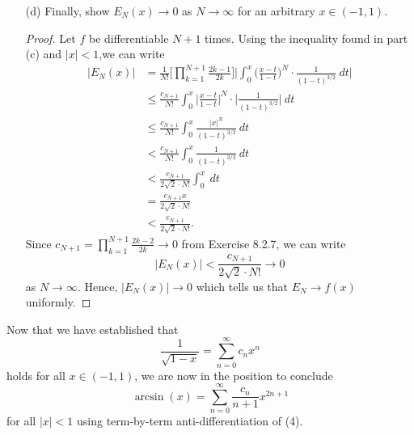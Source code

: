 \begin{enumerate}
\begin{proof}[Solution]
\begin{align*}
                                                     &\leq \sqrt{ (x - t )^{2} }  \\
                                                     &= |  x -t  | \\
                                                     &\leq |  x  |
        \end{align*}
        which holds for \(  t   \).
        \end{proof}
    \item[(d)] Finally, show \( E_{N}(x) \to 0  \) as \( N \to \infty  \) for an arbitrary \( x \in (-1 , 1) \).
        \begin{proof}
        Let \( f  \) be differentiable \( N + 1  \) times. Using the inequality found in part (c) and \( |  x  |  < 1  \),we can write 
        \begin{align*}
            |E_{N}(x)| &= \frac{ 1 }{ N! } \Big[ \prod_{k=1}^{N+1}   \frac{ 2k-1 }{ 2k }  \Big] \Big| \int_{ 0 }^{ x }  \Big( \frac{ x- t  }{ 1 -t  }  \Big)^{N} \cdot \frac{ 1  }{ (1 -t)^{3/2} }  \ dt \Big|  \\
            &\leq \frac{ c_{N+1} }{ N! }  \int_{ 0 }^{ x  } \Big|  \frac{ x -t  }{ 1 - t  } \Big|^{N}      \cdot \Big|  \frac{ 1 }{ (1-t)^{3/2} } \Big| \  dt   \\
            &\leq \frac{ c_{N+1} }{ N! }  \int_{ 0 }^{ x }  \frac{ |x|^{N} }{  (1-t)^{3/2} } \  dt \\
                     &< \frac{ c_{N+1} }{ N! }   \int_{ 0 }^{ x }  \frac{ 1 }{ (1-t)^{3/2} } \  dt \\
                     &< \frac{ c_{N+1} }{ 2\sqrt{ 2 } \cdot N!  }  \int_{ 0 }^{ x }  \ dt  \\
                     &= \frac{ c_{N+1} x  }{ 2 \sqrt{ 2 }  \cdot N!  }   \\
                     &< \frac{ c_{N+1} }{ 2 \sqrt{ 2 }  \cdot N!  }.
        \end{align*}
        Since \( c_{N+1} = \prod_{k=1}^{N+1} \frac{ 2k-2 }{ 2k } \to 0  \) from Exercise 8.2.7, we can write
        \[ | E_{N}(x) | < \frac{ c_{N+1} }{ 2 \sqrt{ 2 }  \cdot N!  }  \to 0  \]
        as \( N \to \infty  \). 
        Hence, \( |E_{N}(x)| \to 0  \) which tells us that \( E_{N} \to f(x)  \) uniformly.
        \end{proof}
\end{enumerate}
Now that we have established that 
\[  \frac{ 1 }{ \sqrt{ 1 - x  }  }  = \sum_{ n=0 }^{ \infty  } c_{n} x^{n} \tag{4}  \] holds for all \( x \in (-1,1 ) \), we are now in the position to conclude 
\[  \arcsin(x) = \sum_{ n=0  }^{ \infty  } \frac{ c_{n} }{  n+1  } x^{2n+1}  \] for all \( |  x  |  < 1  \) using term-by-term anti-differentiation of (4).

